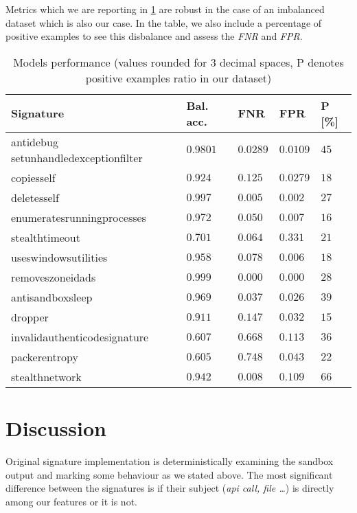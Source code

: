 Metrics which we are reporting in \ref{tab:models_res} are robust in the case of an imbalanced dataset which is also our case. In the table, we also include a percentage of positive examples to see this disbalance and assess the \emph{FNR} and \emph{FPR}.

\begin{table}[h]
  \centering
  \caption{Models performance (values rounded for 3 decimal spaces, P denotes positive examples ratio in our dataset)}
  \begin{tabular}{lllll}
      \toprule
      \textbf{Signature} &
      \textbf{Bal. acc.} &
      \textbf{FNR} &
      \textbf{FPR} &
      \textbf{P [\%]}
      \\
      \midrule
      antidebug setunhandledexceptionfilter & $0.9801$ & $0.0289$ & $0.0109$ & $45$ \\
      \midrule
      copiesself & $0.924$ & $0.125$ & $0.0279$ & $18$ \\
      \midrule
      deletesself & $0.997$ & $0.005$ & $0.002$ & $27$ \\
      \midrule
      enumeratesrunningprocesses & $0.972$ & $0.050$ & $0.007$ & $16$ \\
      \midrule
      stealthtimeout & $0.701$ & $0.064$ & $0.331$ & $21$ \\
      \midrule
      useswindowsutilities & $0.958$ & $0.078$ & $0.006$ & $18$ \\
      \midrule
      removeszoneidads & $0.999$ & $0.000$ & $0.000$ & $28$ \\
      \midrule[0.3pt]
      \midrule[0.3pt]
      antisandboxsleep & $0.969$ & $0.037$ & $0.026$ & $39$ \\
      \midrule
      dropper & $0.911$ & $0.147$ & $0.032$ & $15$ \\
      \midrule
      invalidauthenticodesignature & $0.607$ & $0.668$ & $0.113$ & $36$ \\
      \midrule
      packerentropy & $0.605$ & $0.748$ & $0.043$ & $22$ \\
      \midrule
      stealthnetwork & $0.942$ & $0.008$ & $0.109$ & $66$ \\
      \bottomrule
  \end{tabular}
  \label{tab:models_res}
\end{table}

\section{Discussion}
Original signature implementation is deterministically examining the sandbox output and marking some behaviour as we stated above. The most significant difference between the signatures is if their subject (\emph{api call, file \dots}) is directly among our features or it is not. 

